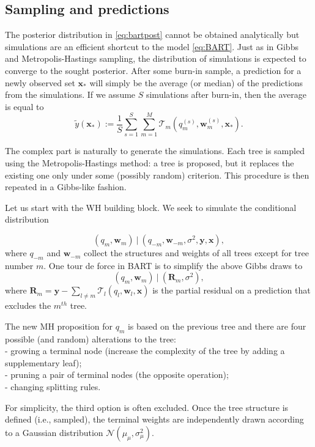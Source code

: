 \documentclass[]{krantz}
\theoremstyle{definition}
\theoremstyle{definition}
\theoremstyle{definition}
\theoremstyle{remark}
\begin{document}
\hypertarget{sampling-and-predictions}{%
\subsection{Sampling and predictions}\label{sampling-and-predictions}}

The posterior distribution in \eqref{eq:bartpost} cannot be obtained
analytically but simulations are an efficient shortcut to the model
\eqref{eq:BART}. Just as in Gibbs and Metropolis-Hastings sampling, the
distribution of simulations is expected to converge to the sought
posterior. After some burn-in sample, a prediction for a newly observed
set \(\textbf{x}_*\) will simply be the average (or median) of the
predictions from the simulations. If we assume \(S\) simulations after
burn-in, then the average is equal to
\[\tilde{y}(\textbf{x}_*):=\frac{1}{S}\sum_{s=1}^S\sum_{m=1}^M\mathcal{T}_m\left(q_m^{(s)},\textbf{w}_m^{(s)}, \textbf{x}_*\right).\]

The complex part is naturally to generate the simulations. Each tree is
sampled using the Metropolis-Hastings method: a tree is proposed, but it
replaces the existing one only under some (possibly random) criterion.
This procedure is then repeated in a Gibbs-like fashion.

Let us start with the WH building block. We seek to simulate the
conditional distribution

\[(q_m,\textbf{w}_m) \ | \ (q_{-m},\textbf{w}_{-m},\sigma^2, \textbf{y}, \textbf{x}),\]
where \(q_{-m}\) and \(\textbf{w}_{-m}\) collect the structures and
weights of all trees except for tree number \(m\). One tour de force in
BART is to simplify the above Gibbs draws to
\[(q_m,\textbf{w}_m) \ | \ (\textbf{R}_{m},\sigma^2 ),\] where
\(\textbf{R}_{m}=\textbf{y}-\sum_{l \neq m}\mathcal{T}_l(q_l,\textbf{w}_l, \textbf{x})\)
is the partial residual on a prediction that excludes the \(m^{th}\)
tree.

The new MH proposition for \(q_m\) is based on the previous tree and
there are four possible (and random) alterations to the tree:\\
- growing a terminal node (increase the complexity of the tree by adding
a supplementary leaf);\\
- pruning a pair of terminal nodes (the opposite operation);\\
- changing splitting rules.

For simplicity, the third option is often excluded. Once the tree
structure is defined (i.e., sampled), the terminal weights are
independently drawn according to a Gaussian distribution
\(\mathcal{N}(\mu_\mu, \sigma_\mu^2)\).
\end{document}
